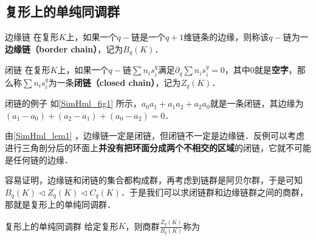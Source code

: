 \subsection{复形上的单纯同调群}


\begin{definition}{边缘链}
在复形$K$上，如果一个$q-$链是一个$q+1$维链条的边缘，则称该$q-$链为一\textbf{边缘链（border chain）}，记为$B_q(K)$．
\end{definition}

\begin{definition}{闭链}
在复形$K$上，如果一个$q-$链$\sum n_is^q_i$满足$\partial_q\sum n_is^q_i=0$，其中$0$就是\textbf{空字}，那么称$\sum n_is^q_i$为一条\textbf{闭链（closed chain）}，记为$Z_q(K)$．
\end{definition}

\begin{example}{闭链的例子}
如\autoref{SimHml_fig1} 所示，$a_0a_1+a_1a_2+a_2a_0$就是一条闭链，其边缘为$(a_1-a_0)+(a_2-a_1)+(a_0-a_2)=0$．
\end{example}

由\autoref{SimHml_lem1} ，边缘链一定是闭链，但闭链不一定是边缘链．反例可以考虑进行三角剖分后的环面上\textbf{并没有把环面分成两个不相交的区域}的闭链，它就不可能是任何链的边缘．

容易证明，边缘链和闭链的集合都构成群，再考虑到链群是阿贝尔群，于是可知$B_q(K)\triangleleft Z_q(K)\triangleleft C_q(K)$．于是我们可以求闭链群和边缘链群之间的商群，那就是复形上的单纯同调群．


\begin{definition}{复形上的单纯同调群}
给定复形$K$，则商群$\frac{Z_q(K)}{B_q(K)}$称为
\end{definition}




